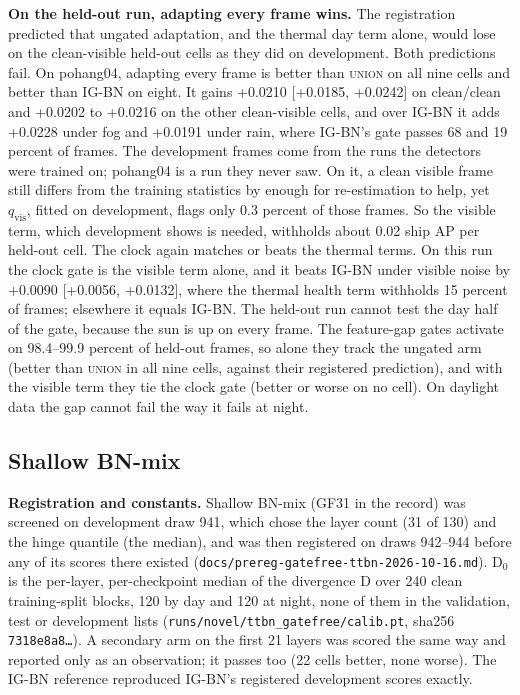 \documentclass[10pt]{article}
\begin{document}
\textbf{On the held-out run, adapting every frame wins.} The registration predicted that ungated adaptation, and the thermal day term alone, would lose on the clean-visible held-out cells as they did on development. Both predictions fail. On pohang04, adapting every frame is better than \textsc{union} on all nine cells and better than IG-BN on eight. It gains +0.0210 [+0.0185, +0.0242] on clean/clean and +0.0202 to +0.0216 on the other clean-visible cells, and over IG-BN it adds +0.0228 under fog and +0.0191 under rain, where IG-BN's gate passes 68 and 19 percent of frames. The development frames come from the runs the detectors were trained on; pohang04 is a run they never saw. On it, a clean visible frame still differs from the training statistics by enough for re-estimation to help, yet $q_{\mathrm{vis}}$, fitted on development, flags only 0.3 percent of those frames. So the visible term, which development shows is needed, withholds about 0.02 ship AP per held-out cell. The clock again matches or beats the thermal terms. On this run the clock gate is the visible term alone, and it beats IG-BN under visible noise by +0.0090 [+0.0056, +0.0132], where the thermal health term withholds 15 percent of frames; elsewhere it equals IG-BN. The held-out run cannot test the day half of the gate, because the sun is up on every frame. The feature-gap gates activate on 98.4--99.9 percent of held-out frames, so alone they track the ungated arm (better than \textsc{union} in all nine cells, against their registered prediction), and with the visible term they tie the clock gate (better or worse on no cell). On daylight data the gap cannot fail the way it fails at night.

\subsection{Shallow BN-mix}\label{app:G.6}
\textbf{Registration and constants.} Shallow BN-mix (GF31 in the record) was screened on development draw 941, which chose the layer count (31 of 130) and the hinge quantile (the median), and was then registered on draws 942--944 before any of its scores there existed (\texttt{docs/\allowbreak{}prereg-gatefree-ttbn-2026-10-16.md}). D$_{0}$ is the per-layer, per-checkpoint median of the divergence D over 240 clean training-split blocks, 120 by day and 120 at night, none of them in the validation, test or development lists (\texttt{runs/\allowbreak{}novel/\allowbreak{}ttbn\_\allowbreak{}gatefree/\allowbreak{}calib.pt}, sha256 \texttt{7318e8a8…}). A secondary arm on the first 21 layers was scored the same way and reported only as an observation; it passes too (22 cells better, none worse). The IG-BN reference reproduced IG-BN's registered development scores exactly.
\end{document}
